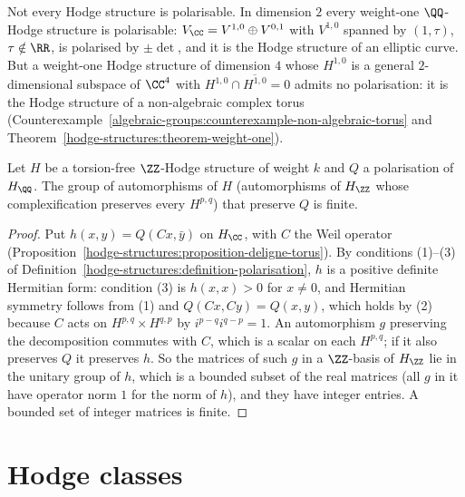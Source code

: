 \begin{counterexample}\label{hodge-structures:counterexample-not-polarisable}
Not every Hodge structure is polarisable. In dimension $2$ every weight-one $\QQ$-Hodge structure is polarisable: $V_\CC = V^{1,0} \oplus V^{0,1}$ with $V^{1,0}$ spanned by $(1, \tau)$,
$\tau \notin \RR$, is polarised by $\pm\det$, and it is the Hodge structure of an elliptic curve. But a weight-one Hodge structure of dimension $4$ whose $H^{1,0}$ is a general $2$-dimensional
subspace of $\CC^4$ with $H^{1,0} \cap \overline{H^{1,0}} = 0$ admits no polarisation: it is the Hodge structure of a non-algebraic complex torus
(Counterexample~\ref{algebraic-groups:counterexample-non-algebraic-torus} and Theorem~\ref{hodge-structures:theorem-weight-one}).
\end{counterexample}

\begin{proposition}\label{hodge-structures:proposition-automorphisms-finite}
Let $H$ be a torsion-free $\ZZ$-Hodge structure of weight $k$ and $Q$ a polarisation of $H_\QQ$. The group of automorphisms of $H$ (automorphisms of $H_\ZZ$ whose complexification preserves every
$H^{p,q}$) that preserve $Q$ is finite.
\end{proposition}

\begin{proof}
Put $h(x, y) = Q(Cx, \bar y)$ on $H_\CC$, with $C$ the Weil operator (Proposition~\ref{hodge-structures:proposition-deligne-torus}). By conditions (1)--(3) of
Definition~\ref{hodge-structures:definition-polarisation}, $h$ is a positive definite Hermitian form: condition (3) is $h(x, x) > 0$ for $x \neq 0$, and Hermitian symmetry follows from (1) and
$Q(Cx, Cy) = Q(x, y)$, which holds by (2) because $C$ acts on $H^{p,q} \times H^{q,p}$ by $i^{p-q}i^{q-p} = 1$. An automorphism $g$ preserving the decomposition commutes with $C$, which is a scalar on each
$H^{p,q}$; if it also preserves $Q$ it preserves $h$. So the matrices of such $g$ in a $\ZZ$-basis of $H_\ZZ$ lie in the unitary group of $h$, which is a bounded subset of the real matrices (all $g$ in it have
operator norm $1$ for the norm of $h$), and they have integer entries. A bounded set of integer matrices is finite.
\end{proof}

\section{Hodge classes}\label{hodge-structures:section-hodge-classes}

